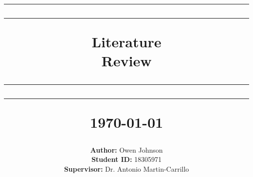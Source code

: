 \documentclass[10pt, table, twoside]{article}
\numberwithin{equation}{section}
\begin{document}
\title{

    \rule{\textwidth}{1.6pt}\vspace*{-\baselineskip}\vspace*{2pt} %
	\rule{\textwidth}{0.4pt} %
	
	\vspace{0.10\baselineskip} %
	
	{\Huge Literature \\ Review} %
	
	\vspace{0.05\baselineskip} %
	
	\rule{\textwidth}{0.4pt}\vspace*{-\baselineskip}\vspace{3.2pt} %
	\rule{\textwidth}{1.6pt} %
	
	\small{\today}
	
	\vspace{4cm} %
	
   
	}
	


\date{}

\author{\textbf{Author:} Owen Johnson\\
		\textbf{Student ID:} 18305971\\
		\textbf{Supervisor:} Dr. Antonio Martin-Carrillo \\ 
		\vspace{4cm}
		}






\maketitle 
\thispagestyle{empty}
\newpage

\end{document}
